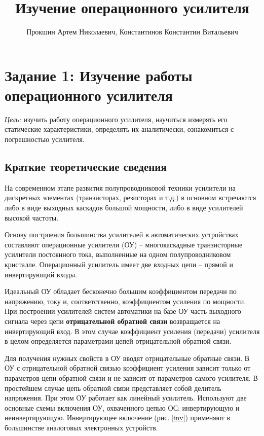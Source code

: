 \title{Изучение операционного усилителя}
\author{Прокшин Артем Николаевич, Константинов Константин Витальевич}



\section{Задание 1: Изучение работы операционного усилителя}

{\it Цель:} изучить работу операционного усилителя, научиться измерять его статические характеристики, определять их аналитически, ознакомиться с погрешностью усилителя.
 
\subsection{Краткие теоретические сведения}

На современном этапе развития полупроводниковой техники усилители на дискретных элементах (транзисторах, резисторах и т.д.) в основном встречаются либо в виде выходных каскадов большой мощности, либо в виде усилителей высокой частоты.

Основу построения большинства усилителей в автоматических устройствах составляют операционные усилители (ОУ) -- многокаскадные транзисторные усилители постоянного тока, выполненные на одном полупроводниковом кристалле. 
Операционный усилитель имеет две входных цепи -- прямой и инвертирующий входы.

Идеальный ОУ обладает бесконечно большим коэффициентом передачи по напряжению, току и, соответственно, коэффициентом усиления по мощности. При построении усилителей систем автоматики на базе ОУ часть выходного сигнала через цепи {\bf отрицательной обратной связи} 
возвращается на инвертирующий вход. 
В этом случае коэффициент усиления (передачи) усилителя в целом определяется параметрами цепей отрицательной обратной связи.

Для получения нужных свойств в ОУ вводят отрицательные обратные связи. В ОУ с отрицательной обратной связью коэффициент усиления
зависит только от параметров цепи обратной связи и не зависит от параметров самого усилителя. В простейшем случае цепь 
обратной связи представляет собой делитель напряжения. При этом ОУ работает как линейный усилитель. Используют две основные
схемы включения ОУ, охваченного цепью ОС: инвертирующую и неинвертирующую. Инвертирующее включение (рис. \ref{inv}) применяют в 
большинстве аналоговых электронных устройств.

